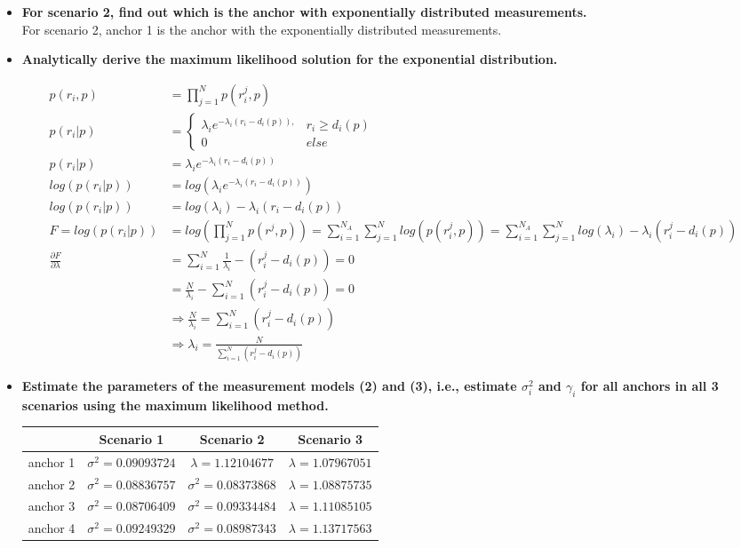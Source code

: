 \documentclass[a4paper]{article}
\begin{document}
\begin{itemize}[label={}]

\item \textbf{For scenario 2, find out which is the anchor with exponentially distributed measurements.} \\
For scenario 2, anchor 1 is the anchor with the exponentially distributed measurements.
  
\item \textbf{Analytically derive the maximum likelihood solution for the exponential distribution.}

\begin{align*}
p(r_i,p) &= \prod_{j=1}^N p(r_i^j,p) \\
p(r_i|p) &= \begin{cases} \lambda_i e^{-\lambda_i(r_i-d_i(p)),} & r_i\geq d_i(p)\\ 0 & else \end{cases} \\
p(r_i|p) &= \lambda_ie^{-\lambda_i(r_i-d_i(p))} \\
log(p(r_i|p)) &= log(\lambda_ie^{-\lambda_i(r_i-d_i(p))}) \\
log(p(r_i|p)) &= log(\lambda_i)-\lambda_i(r_i-d_i(p)) \\
F = log(p(r_i|p)) &= log(\prod_{j=1}^N p(r^j,p))
= \sum_{i=1}^{N_A} \sum_{j=1}^N log(p(r_i^j, p))
= \sum_{i=1}^{N_A} \sum_{j=1}^N log(\lambda_i) - \lambda_i(r_i^j - d_i(p)) \\
\frac{\partial F}{\partial \lambda} &= \sum_{i=1}^N \frac{1}{\lambda_i} - (r_i^j-d_i(p)) = 0 \\
&= \frac{N}{\lambda_i} - \sum_{i=1}^N (r_i^j-d_i(p)) = 0 \\
&\Rightarrow \frac{N}{\lambda_i} = \sum_{i=1}^N (r_i^j-d_i(p)) \\
&\Rightarrow \lambda_i = \frac{N}{\sum_{i=1}^N (r_i^j-d_i(p))}
\end{align*}

\item \textbf{Estimate the parameters of the measurement models (2) and (3), i.e., estimate $\sigma^2_i$ and $\gamma_i$ for all anchors in all 3 scenarios using the maximum likelihood method.} \\

\begin{center}
\begin{tabular}{|c|c|c|c|} 
\hline
 &Scenario 1 &Scenario 2 &Scenario 3 \\
\hline
anchor 1 &$\sigma^2 = 0.09093724$ &$\lambda = 1.12104677$ &$\lambda = 1.07967051$ \\ 
anchor 2 &$\sigma^2 = 0.08836757$ &$\sigma^2 = 0.08373868$ &$\lambda = 1.08875735$ \\ 
anchor 3 &$\sigma^2 = 0.08706409$ &$\sigma^2 = 0.09334484$ &$\lambda = 1.11085105$ \\
anchor 4 &$\sigma^2 = 0.09249329$ &$\sigma^2 = 0.08987343$ &$\lambda = 1.13717563$ \\
\hline
\end{tabular}
\end{center}

\end{itemize}
\end{document}
